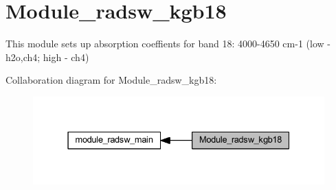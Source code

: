 \hypertarget{group__module__radsw__kgb18}{}\section{Module\+\_\+radsw\+\_\+kgb18}
\label{group__module__radsw__kgb18}


This module sets up absorption coeffients for band 18\+: 4000-\/4650 cm-\/1 (low -\/ h2o,ch4; high -\/ ch4)  


Collaboration diagram for Module\+\_\+radsw\+\_\+kgb18\+:\nopagebreak
\begin{figure}[H]
\begin{center}
\leavevmode
\includegraphics[width=331pt]{group__module__radsw__kgb18}
\end{center}
\end{figure}
